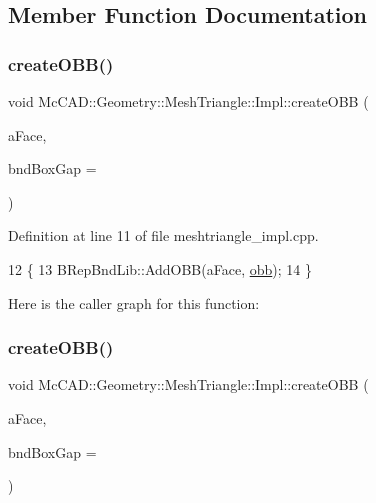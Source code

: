 \subsection{Member Function Documentation}
\mbox{\label{classMcCAD_1_1Geometry_1_1MeshTriangle_1_1Impl_a6fb5eafd5e28695aacedc93bdd9b7da3}} 
\subsubsection{\texorpdfstring{create\+O\+B\+B()}{createOBB()}\hspace{0.1cm}{\footnotesize\ttfamily [1/2]}}
{\footnotesize\ttfamily void Mc\+C\+A\+D\+::\+Geometry\+::\+Mesh\+Triangle\+::\+Impl\+::create\+O\+BB (\begin{DoxyParamCaption}\item[{const Topo\+D\+S\+\_\+\+Face \&}]{a\+Face,  }\item[{Standard\+\_\+\+Real}]{bnd\+Box\+Gap = {} }\end{DoxyParamCaption})}



Definition at line 11 of file meshtriangle\+\_\+impl.\+cpp.


\begin{DoxyCode}
12                                                                        \{
13     BRepBndLib::AddOBB(aFace, \hyperlink{classMcCAD_1_1Geometry_1_1MeshTriangle_1_1Impl_a1b7bcf68b5df6bca6d87f674eb048a4d}{obb});
14 \}
\end{DoxyCode}
Here is the caller graph for this function\+:
\mbox{\label{classMcCAD_1_1Geometry_1_1MeshTriangle_1_1Impl_a6fb5eafd5e28695aacedc93bdd9b7da3}} 
\subsubsection{\texorpdfstring{create\+O\+B\+B()}{createOBB()}\hspace{0.1cm}{\footnotesize\ttfamily [2/2]}}
{\footnotesize\ttfamily void Mc\+C\+A\+D\+::\+Geometry\+::\+Mesh\+Triangle\+::\+Impl\+::create\+O\+BB (\begin{DoxyParamCaption}\item[{const Topo\+D\+S\+\_\+\+Face \&}]{a\+Face,  }\item[{Standard\+\_\+\+Real}]{bnd\+Box\+Gap = {} }\end{DoxyParamCaption})}

